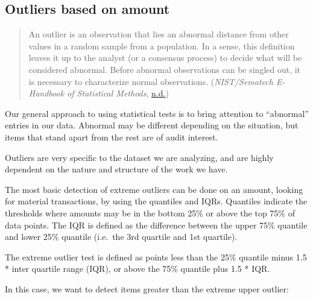 \documentclass[
]{book}
\newenvironment{Shaded}{\begin{snugshade}}{\end{snugshade}}
\newcommand{\CommentTok}[1]{\textcolor[rgb]{0.56,0.35,0.01}{\textit{#1}}}
\newcommand{\DecValTok}[1]{\textcolor[rgb]{0.00,0.00,0.81}{#1}}
\newcommand{\FloatTok}[1]{\textcolor[rgb]{0.00,0.00,0.81}{#1}}
\newcommand{\KeywordTok}[1]{\textcolor[rgb]{0.13,0.29,0.53}{\textbf{#1}}}
\newcommand{\NormalTok}[1]{#1}
\newcommand{\OperatorTok}[1]{\textcolor[rgb]{0.81,0.36,0.00}{\textbf{#1}}}
\newcommand{\StringTok}[1]{\textcolor[rgb]{0.31,0.60,0.02}{#1}}
\begin{document}
\hypertarget{outliers-based-on-amount}{%
\subsection{Outliers based on amount}\label{outliers-based-on-amount}}

\begin{quote}
An outlier is an observation that lies an abnormal distance from other values in a random sample from a population. In a sense, this definition leaves it up to the analyst (or a consensus process) to decide what will be considered abnormal. Before abnormal observations can be singled out, it is necessary to characterize normal observations. (\emph{NIST/Sematech E-Handbook of Statistical Methods}, \protect\hyperlink{ref-outliers}{n.d.})
\end{quote}

Our general approach to using statistical tests is to bring attention to ``abnormal'' entries in our data. Abnormal may be different depending on the situation, but items that stand apart from the rest are of audit interest.

Outliers are very specific to the dataset we are analyzing, and are highly dependent on the nature and structure of the work we have.

The most basic detection of extreme outliers can be done on an amount, looking for material transactions, by using the quantiles and IQRs. Quantiles indicate the thresholds where amounts may be in the bottom 25\% or above the top 75\% of data points. The IQR is defined as the difference between the upper 75\% quantile and lower 25\% quantile (i.e.~the 3rd quartile and 1st quartile).

The extreme outlier test is defined as points less than the 25\% quantile minus 1.5 * inter quartile range (IQR), or above the 75\% quantile plus 1.5 * IQR.

In this case, we want to detect items greater than the extreme upper outlier:

\begin{Shaded}
\end{Shaded}
\end{document}
